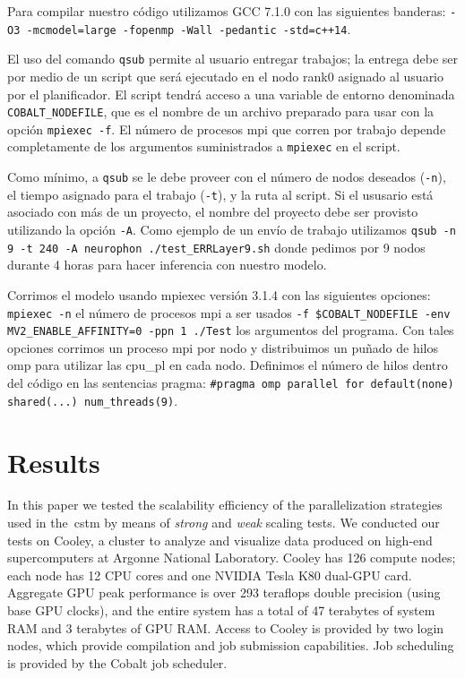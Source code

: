 {Para compilar nuestro código utilizamos GCC 7.1.0 con las siguientes banderas: \texttt{-O3 -mcmodel=large -fopenmp -Wall -pedantic -std=c++14}.

El uso del comando \texttt{qsub} permite al usuario entregar trabajos; la entrega debe ser por medio de un script que será ejecutado en el nodo rank0 asignado al usuario por el planificador.
El script tendrá acceso a una variable de entorno denominada \texttt{COBALT\_NODEFILE}, que es el nombre de un archivo preparado para usar con la opción \texttt{mpiexec -f}. 
El número de procesos \gls{mpi} que corren por trabajo depende completamente de los argumentos suministrados a \texttt{mpiexec} en el script.

Como mínimo, a \texttt{qsub} se le debe proveer con el número de nodos deseados (\texttt{-n}), el tiempo asignado para el trabajo (\texttt{-t}), y la ruta al script.
Si el ususario está asociado con más de un proyecto, el nombre del proyecto debe ser provisto utilizando la opción \texttt{-A}.
Como ejemplo de un envío de trabajo utilizamos \texttt{qsub -n 9 -t 240 -A neurophon ./test\_ERRLayer9.sh} donde pedimos por 9 nodos durante 4 horas para hacer inferencia con nuestro modelo.

Corrimos el modelo usando mpiexec versión 3.1.4 con las siguientes opciones: \texttt{mpiexec -n} el número de procesos \gls{mpi} a ser usados \texttt{-f \$COBALT\_NODEFILE -env MV2\_ENABLE\_AFFINITY=0 -ppn 1 ./Test} los argumentos del programa.
Con tales opciones corrimos un proceso \gls{mpi} por nodo y distribuimos un puñado de hilos \gls{omp} para utilizar las \gls{cpu_pl} en cada nodo.
Definimos el número de hilos dentro del código en las sentencias pragma: \texttt{\#pragma omp parallel for default(none) shared(...) num\_threads(9)}.
}{
\section{Results}

In this paper we tested the scalability efficiency of the parallelization strategies used in the~\gls{cstm} by means of \emph{strong} and \emph{weak} scaling tests. We conducted our tests on Cooley, a cluster to analyze and visualize data produced on high-end supercomputers at Argonne National Laboratory. Cooley has 126 compute nodes; each node has 12 CPU cores and one NVIDIA Tesla K80 dual-GPU card. Aggregate GPU peak performance is over 293 teraflops double precision (using base GPU clocks), and the entire system has a total of 47 terabytes of system RAM and 3 terabytes of GPU RAM. Access to Cooley is provided by two login nodes, which provide compilation and job submission capabilities. Job scheduling is provided by the Cobalt job scheduler.

}
